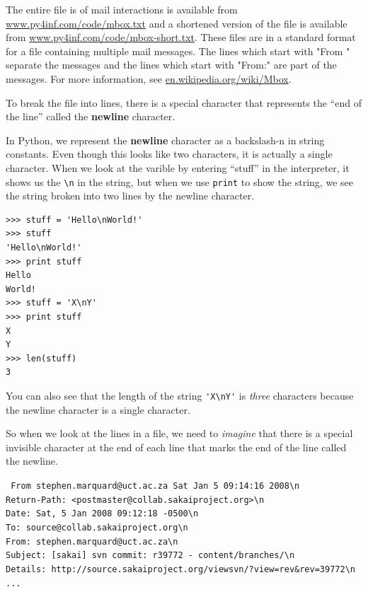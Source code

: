 \documentclass[10pt]{book}
\begin{document}
The entire file is of mail interactions is available from 
\url{www.py4inf.com/code/mbox.txt} 
and a shortened version of the file is available from
\url{www.py4inf.com/code/mbox-short.txt}.
These files are in a standard format for a file containing 
multiple mail messages. The lines which start with 
"From " separate the messages and the lines which start 
with "From:" are part of the messages. 
For more information, see 
\url{en.wikipedia.org/wiki/Mbox}. 

To break the file into lines, there is a special character that 
represents the ``end of the line'' called the {\bf newline} character.

In Python, we represent the {\bf newline} character as a backslash-n in 
string constants.  Even though this looks like two characters, it
is actually a single character.  When we look at the varible by entering
``stuff'' in the interpreter, it shows us the \verb"\n" in the string, 
but when we use {\tt print} to show the string, we see the string broken
into two lines by the newline character.

\beforeverb
\begin{verbatim}
>>> stuff = 'Hello\nWorld!'
>>> stuff
'Hello\nWorld!'
>>> print stuff
Hello
World!
>>> stuff = 'X\nY'
>>> print stuff
X
Y
>>> len(stuff)
3
\end{verbatim}
\afterverb
%

You can also see that the length of the string \verb"'X\nY'" is {\em three}
characters because the newline character is a single character.

So when we look at the lines in a file, we need to {\em imagine}
that there is a special invisible character at the end of each line
that marks the end of the line called the newline.  

{\tt
From stephen.marquard@uct.ac.za Sat Jan  5 09:14:16 2008\verb"\n"\\
Return-Path: <postmaster@collab.sakaiproject.org>\verb"\n"\\
Date: Sat, 5 Jan 2008 09:12:18 -0500\verb"\n"\\
To: source@collab.sakaiproject.org\verb"\n"\\
From: stephen.marquard@uct.ac.za\verb"\n"\\
Subject: [sakai] svn commit: r39772 - content/branches/\verb"\n"\\
Details: http://source.sakaiproject.org/viewsvn/?view=rev\&rev=39772\verb"\n"\\
...
}
\end{document}
